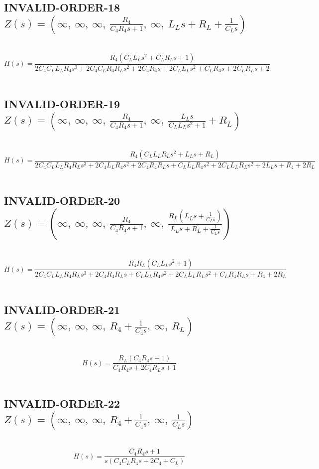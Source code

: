 \documentclass{article}
\begin{document}
\subsection{INVALID-ORDER-18 $Z(s) = \left( \infty, \  \infty, \  \infty, \  \frac{R_{4}}{C_{4} R_{4} s + 1}, \  \infty, \  L_{L} s + R_{L} + \frac{1}{C_{L} s}\right)$ } \ 
\textbf{\[H(s) = \frac{R_{4} \left(C_{L} L_{L} s^{2} + C_{L} R_{L} s + 1\right)}{2 C_{4} C_{L} L_{L} R_{4} s^{3} + 2 C_{4} C_{L} R_{4} R_{L} s^{2} + 2 C_{4} R_{4} s + 2 C_{L} L_{L} s^{2} + C_{L} R_{4} s + 2 C_{L} R_{L} s + 2}\] } \ 
\subsection{INVALID-ORDER-19 $Z(s) = \left( \infty, \  \infty, \  \infty, \  \frac{R_{4}}{C_{4} R_{4} s + 1}, \  \infty, \  \frac{L_{L} s}{C_{L} L_{L} s^{2} + 1} + R_{L}\right)$ } \ 
\textbf{\[H(s) = \frac{R_{4} \left(C_{L} L_{L} R_{L} s^{2} + L_{L} s + R_{L}\right)}{2 C_{4} C_{L} L_{L} R_{4} R_{L} s^{3} + 2 C_{4} L_{L} R_{4} s^{2} + 2 C_{4} R_{4} R_{L} s + C_{L} L_{L} R_{4} s^{2} + 2 C_{L} L_{L} R_{L} s^{2} + 2 L_{L} s + R_{4} + 2 R_{L}}\] } \ 
\subsection{INVALID-ORDER-20 $Z(s) = \left( \infty, \  \infty, \  \infty, \  \frac{R_{4}}{C_{4} R_{4} s + 1}, \  \infty, \  \frac{R_{L} \left(L_{L} s + \frac{1}{C_{L} s}\right)}{L_{L} s + R_{L} + \frac{1}{C_{L} s}}\right)$ } \ 
\textbf{\[H(s) = \frac{R_{4} R_{L} \left(C_{L} L_{L} s^{2} + 1\right)}{2 C_{4} C_{L} L_{L} R_{4} R_{L} s^{3} + 2 C_{4} R_{4} R_{L} s + C_{L} L_{L} R_{4} s^{2} + 2 C_{L} L_{L} R_{L} s^{2} + C_{L} R_{4} R_{L} s + R_{4} + 2 R_{L}}\] } \ 
\subsection{INVALID-ORDER-21 $Z(s) = \left( \infty, \  \infty, \  \infty, \  R_{4} + \frac{1}{C_{4} s}, \  \infty, \  R_{L}\right)$ } \ 
\textbf{\[H(s) = \frac{R_{L} \left(C_{4} R_{4} s + 1\right)}{C_{4} R_{4} s + 2 C_{4} R_{L} s + 1}\] } \ 
\subsection{INVALID-ORDER-22 $Z(s) = \left( \infty, \  \infty, \  \infty, \  R_{4} + \frac{1}{C_{4} s}, \  \infty, \  \frac{1}{C_{L} s}\right)$ } \ 
\textbf{\[H(s) = \frac{C_{4} R_{4} s + 1}{s \left(C_{4} C_{L} R_{4} s + 2 C_{4} + C_{L}\right)}\] } \ 
\end{document}
